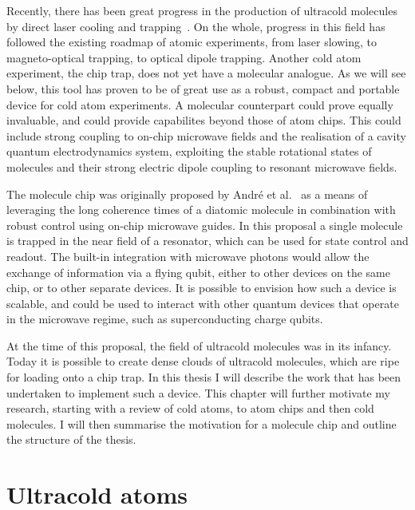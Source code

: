 
Recently, there has been great progress in the production of ultracold
molecules by direct laser cooling and trapping~\cite{Fitch2021}. On the whole,
progress in this field has followed the existing roadmap of atomic experiments,
from laser slowing, to magneto-optical trapping, to optical dipole trapping.
Another cold atom experiment, the chip trap, does not yet have a molecular
analogue. As we will see below, this tool has proven to be of great use as a
robust, compact and portable device for cold atom experiments. A molecular
counterpart could prove equally invaluable, and could provide capabilites
beyond those of atom chips.  This could include strong coupling to on-chip
microwave fields and  the realisation of a cavity quantum electrodynamics
system, exploiting the stable rotational states of molecules and their strong
electric dipole coupling to resonant microwave fields.

The molecule chip was originally proposed by Andr\'e et al.~\cite{Andre2006} as
a means of leveraging the long coherence times of a diatomic molecule in
combination with robust control using on-chip microwave guides. In this
proposal a single molecule is trapped in the near field of a resonator, which
can be used for state control and readout. The built-in integration with
microwave photons would allow the exchange of information via a flying qubit,
either to other devices on the same chip, or to other separate devices.
%
It is possible to envision how such a device is scalable, and could be used to 
interact with other quantum devices that operate in the microwave regime, such
as superconducting charge qubits.

At the time of this proposal, the field of ultracold molecules was in its
infancy. Today it is possible to create dense clouds of ultracold molecules,
which are ripe for loading onto a chip trap. In this thesis I will describe the
work that has been undertaken to implement such a device. This chapter will
further motivate my research, starting with a review of cold atoms, to atom
chips and then cold molecules. I will then summarise the motivation for a
molecule chip and outline the structure of the thesis.

\section{Ultracold atoms}
\label{intro:atoms}

